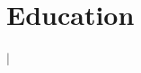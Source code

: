 
\section{Education}
\sectionListStart

\companyNameAndLocationHeading
{\mycollege{} $|$ \small{\mycollegelocation}}{\textit{\mycollegeperiod}}
\titleAndDateHeading
{\mydegree}{\textbf{\mygpa}}

\sectionListEnd